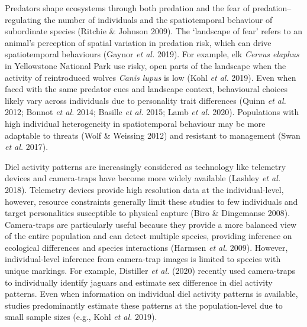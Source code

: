 \documentclass[11pt,a4paper,titlepage,twoside,openright]{style/unimelbthesis}
\begin{document}
\begin{mainmatter}
Predators shape ecosystems through both predation and the fear of predation--regulating the number of individuals and the spatiotemporal behaviour of subordinate species (Ritchie \& Johnson 2009). The `landscape of fear' refers to an animal's perception of spatial variation in predation risk, which can drive spatiotemporal behaviours (Gaynor \emph{et al.} 2019). For example, elk \emph{Cervus elaphus} in Yellowstone National Park use risky, open parts of the landscape when the activity of reintroduced wolves \emph{Canis lupus} is low (Kohl \emph{et al.} 2019). Even when faced with the same predator cues and landscape context, behavioural choices likely vary across individuals due to personality trait differences (Quinn \emph{et al.} 2012; Bonnot \emph{et al.} 2014; Basille \emph{et al.} 2015; Lamb \emph{et al.} 2020). Populations with high individual heterogeneity in spatiotemporal behaviour may be more adaptable to threats (Wolf \& Weissing 2012) and resistant to management (Swan \emph{et al.} 2017).

Diel activity patterns are increasingly considered as technology like telemetry devices and camera-traps have become more widely available (Lashley \emph{et al.} 2018). Telemetry devices provide high resolution data at the individual-level, however, resource constraints generally limit these studies to few individuals and target personalities susceptible to physical capture (Biro \& Dingemanse 2008). Camera-traps are particularly useful because they provide a more balanced view of the entire population and can detect multiple species, providing inference on ecological differences and species interactions (Harmsen \emph{et al.} 2009). However, individual-level inference from camera-trap images is limited to species with unique markings. For example, Distiller \emph{et al.} (2020) recently used camera-traps to individually identify jaguars and estimate sex difference in diel activity patterns. Even when information on individual diel activity patterns is available, studies predominantly estimate these patterns at the population-level due to small sample sizes (e.g., Kohl \emph{et al.} 2019).


\end{mainmatter}
\end{document}
